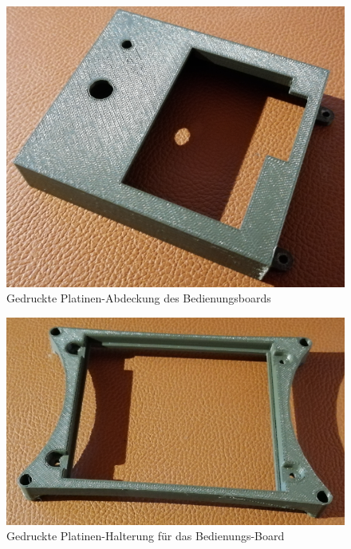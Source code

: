 \begin{minipage}[b]{0.47\textwidth}
\centering
\begin{figure}[H] %
\includegraphics[width=.9\textwidth]{sec2/images/3DAnbaukomponenten/Druckbilder/DisplayAbdeckungDruck} 
\centering
\captionsetup{width=.95\textwidth}
\caption[Gedruckte Platinen-Abdeckung des Bedienungsboards]{Gedruckte Platinen-Abdeckung des Bedienungsboards}\centering
\label{fig:DisplayAbdeckungDruck}
\end{figure}
\end{minipage}
\begin{minipage}[b]{0.47\textwidth}
\begin{figure}[H] %
\includegraphics[width=.9\textwidth]{sec2/images/3DAnbaukomponenten/Druckbilder/PlatinenHalterungDruck} 
\centering
\captionsetup{width=.95\textwidth}
\caption[Gedruckte Platinen-Halterung für das Bedienungs-Board]{Gedruckte Platinen-Halterung für das Bedienungs-Board}\centering
\label{fig:PlatinenHalterungDruck}
\end{figure}
\end{minipage}
\vspace{4mm}

